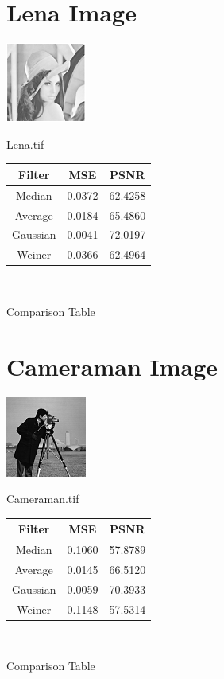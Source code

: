 \section*{Lena Image}
\begin{center}

\includegraphics{lena.png}



\vspace{1cm}	
Lena.tif 

\begin{tabular}{|c|c|c|}
	\hline 
	Filter & MSE & PSNR \\ 
	\hline 
	Median & 0.0372 & 62.4258 \\ 
	\hline 
	Average & 0.0184 & 65.4860 \\ 
	\hline 
	Gaussian & 0.0041 & 72.0197 \\ 
	\hline 
	Weiner & 0.0366 & 62.4964 \\ 
	\hline 
\end{tabular} 

\

Comparison Table
\end{center}
\vspace{3cm}

\section*{Cameraman Image}
\begin{center}
\includegraphics{cameraman.png}

\vspace{1cm}	
	Cameraman.tif
	
	\begin{tabular}{|c|c|c|}
		\hline 
		Filter & MSE & PSNR \\ 
		\hline 
		Median & 0.1060 & 57.8789 \\ 
		\hline 
		Average & 0.0145 & 66.5120 \\ 
		\hline 
		Gaussian & 0.0059 & 70.3933 \\ 
		\hline 
		Weiner & 0.1148 & 57.5314 \\ 
		\hline 
	\end{tabular} 
	
	\
	
	Comparison Table
\end{center}
\vspace{3cm}

